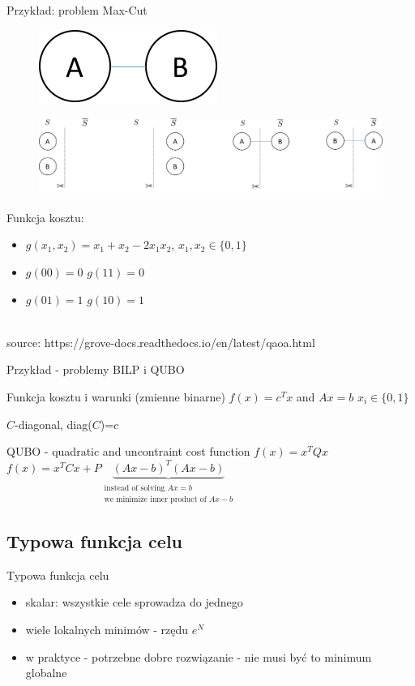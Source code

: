 	\begin{frame}{Przykład: problem Max-Cut}
 \begin{figure}
\includegraphics[scale=0.3]{img/18/barbell.png}
\end{figure} 
\begin{figure}
\includegraphics[scale=0.18]{img/18/partition_barbell.png}
\end{figure} 
Funkcja kosztu:
    \begin{itemize}
        \item[] $g(x_1, x_2)=x_1+x_2-2x_1 x_2$, $x_1,x_2 \in\{0,1\}$
        \item[] $g(00)=0$ $g(11)=0$
        \item[] $g(01)=1$ $g(10)=1$
    \end{itemize}
    \\
    \small{source: https://grove-docs.readthedocs.io/en/latest/qaoa.html}
\end{frame}
\begin{frame}{Przykład - problemy BILP i QUBO}
\begin{block}{Funkcja kosztu i warunki (zmienne binarne)}
$f(x)=c^Tx$ and  $Ax=b$ $x_i \in \{0,1\}$
\end{block}
\begin{center}
    \arrowdown $C$-diagonal, diag($C$)=$c$
\end{center}
\begin{block}{QUBO - quadratic and uncontraint cost function $f(x)=x^TQx$}
$f(x)=x^TCx+P\underbrace{(Ax-b)^T(Ax-b)}_{\substack{\text{instead of solving } Ax=b \\ \text{we minimize inner product of }
Ax-b
}}$ 
\end{block}
\end{frame}

\subsection{Typowa funkcja celu}
	\begin{frame}{Typowa funkcja celu}
		\begin{itemize}
			\item skalar: wszystkie cele sprowadza do jednego
			\item wiele lokalnych minimów - rzędu $e^N$
			\item w praktyce - potrzebne dobre rozwiązanie - nie musi być to minimum globalne
		\end{itemize}

	\end{frame}

